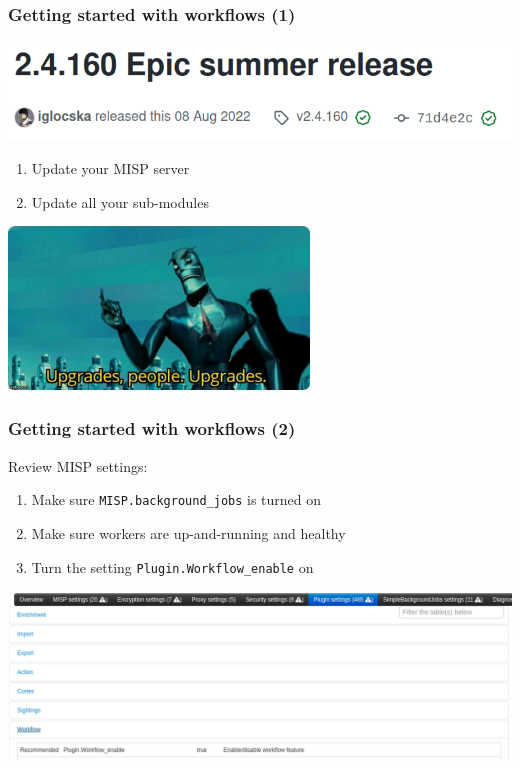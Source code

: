 \begin{frame}
    \frametitle{Getting started with workflows (1)}
    \begin{center}
        \includegraphics[width=0.9\linewidth]{pictures/workflow-release.png}
    \end{center}
    \begin{enumerate}
        \item Update your MISP server
        \item Update all your sub-modules
    \end{enumerate}
    \begin{center}
        \includegraphics[width=0.6\textwidth]{pictures/upgrade-people.jpeg}
    \end{center}
\end{frame}

\begin{frame}
    \frametitle{Getting started with workflows (2)}
    Review MISP settings:
    \begin{enumerate}
        \item Make sure \texttt{MISP.background\_jobs} is turned on
        \item Make sure workers are up-and-running and healthy
        \item Turn the setting \texttt{Plugin.Workflow\_enable} on
    \end{enumerate}
    \begin{center}
        \includegraphics[width=1.0\linewidth]{pictures/settings-2.png}
    \end{center}
\end{frame}

